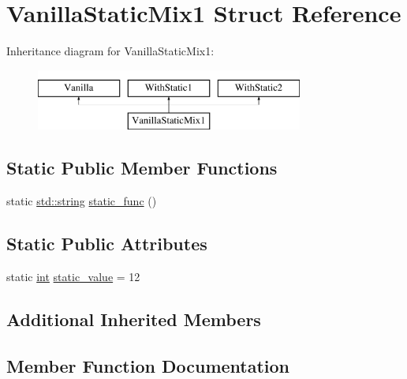 \hypertarget{struct_vanilla_static_mix1}{}\section{Vanilla\+Static\+Mix1 Struct Reference}
\label{struct_vanilla_static_mix1}
Inheritance diagram for Vanilla\+Static\+Mix1\+:\begin{figure}[H]
\begin{center}
\leavevmode
\includegraphics[height=2.000000cm]{struct_vanilla_static_mix1}
\end{center}
\end{figure}
\subsection*{Static Public Member Functions}
\begin{DoxyCompactItemize}
\item 
static \mbox{\hyperlink{_s_d_l__opengl__glext_8h_ab4ccfaa8ab0e1afaae94dc96ef52dde1}{std\+::string}} \mbox{\hyperlink{struct_vanilla_static_mix1_abf6b9fdcbc70eee3837daa6ac7276db3}{static\+\_\+func}} ()
\end{DoxyCompactItemize}
\subsection*{Static Public Attributes}
\begin{DoxyCompactItemize}
\item 
static \mbox{\hyperlink{warnings_8h_a74f207b5aa4ba51c3a2ad59b219a423b}{int}} \mbox{\hyperlink{struct_vanilla_static_mix1_a6322ef80a86975aba922ce210d5680d4}{static\+\_\+value}} = 12
\end{DoxyCompactItemize}
\subsection*{Additional Inherited Members}


\subsection{Member Function Documentation}
\mbox{\label{struct_vanilla_static_mix1_abf6b9fdcbc70eee3837daa6ac7276db3}} 
